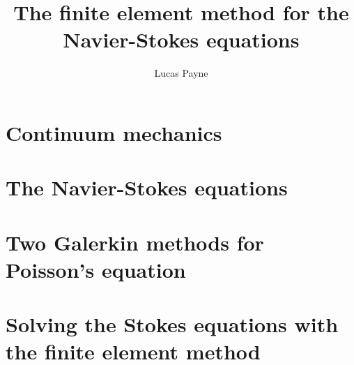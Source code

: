 \documentclass[11pt,a4paper]{memoir}
\begin{document}
\title{\Huge \textbf{The finite element method for the Navier-Stokes equations}}
\author{Lucas Payne}

\maketitle

\tableofcontents

\chapter{Continuum mechanics}


\chapter{The Navier-Stokes equations}


\chapter{Two Galerkin methods for Poisson's equation}


\chapter{Solving the Stokes equations with the finite element method}


\end{document}
